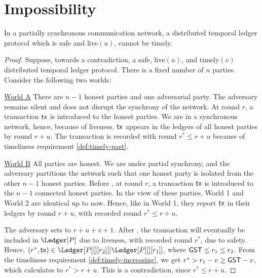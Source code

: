 \section{Impossibility}

\begin{lemma}
  In a partially synchronous communication network, a distributed temporal ledger protocol
  which is safe and live$(u)$, cannot be timely.
\end{lemma}
\begin{proof}
  Suppose, towards a contradiction, a safe, live$(u)$, and timely$(v)$ distributed temporal ledger protocol.
  There is a fixed number of $n$ parties.
  Consider the following two worlds:

  \noindent
  \underline{World A}
  There are $n-1$ honest parties and one adversarial party. The adversary remains silent and
  does not disrupt the synchrony of the network.
  At round $r$, a transaction $\textsf{tx}$ is introduced to the honest parties. We are in a
  synchronous network, hence, because of liveness, $\textsf{tx}$ appears in the ledgers of all honest parties
  by round $r + u$. The transaction is recorded with round $r^* \leq r + u$ because of
  timeliness requirement \ref{def:timely-past}.

  \noindent
  \underline{World B}
  All parties are honest. We are under partial synchrony, and the adversary partitions the network such that
  one honest party is isolated from the other $n-1$ honest parties.
  Before \gst, at round $r$, a transaction $\textsf{tx}$ is introduced to the $n-1$ connected
  honest parties. In the view of these parties,
  World 1 and World 2 are identical up to now. Hence, like in World 1,
  they report $\textsf{tx}$ in their ledgers by round $r + u$, with recorded round $r^* \leq r + u$.

  The adversary sets \gst to  $r + u + v + 1$.
  After \gst, the transaction will eventually be included in $\Ledger[P]$ due to liveness,
  with recorded round $r^*$, due to safety.
  Hence, $(r^*, \tx) \in \Ledger[P][][r_2][|\Ledger[P][][r_1]]$,
  where $\textsf{GST} \leq r_1 \leq r_2$.
  From the timeliness requirement \ref{def:timely-increasing}, we
  get $r^* > r_1 - v \geq \textsf{GST} - v$, which calculates to $r^* > r + u$.
  This is a contradiction, since $r^* \leq r + u$.
\end{proof}
